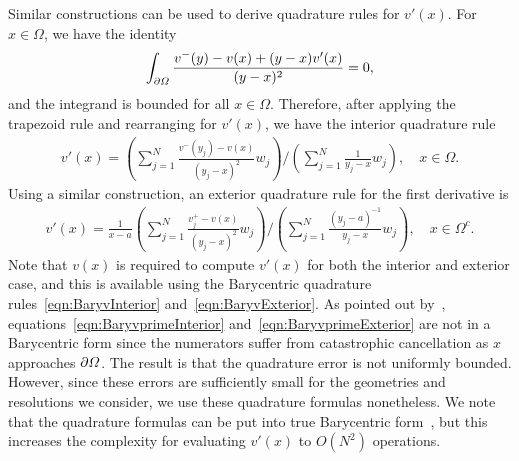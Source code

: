 \documentclass{jfm}
\begin{document}
Similar constructions can be used to derive quadrature rules
for $v'(x)$.  For $x \in \Omega$, we have the identity
\begin{align}
  \int_{{\partial}\varOmega} \frac{v^-(y) - v(x) + (y-x)v'(x)}{(y - x)^2} = 0,
\end{align}
and the integrand is bounded for all $x \in \Omega$.  Therefore, after
applying the trapezoid rule and rearranging for $v'(x)$, we have the
interior quadrature rule
\begin{align}
  v'(x) = \left(\sum_{j=1}^{N}
    \frac{v^{-}(y_j) - v(x)}{(y_j-x)^2} w_j \right)
  \Bigg/
  \left(\sum_{j=1}^{N} \frac{1}{y_j-x} w_j\right), 
  \quad x \in \Omega.
  \label{eqn:BaryvprimeInterior}
\end{align}
Using a similar construction, an exterior quadrature rule for the first
derivative is
\begin{align}
  v'(x) = \frac{1}{x-a} \left(\sum_{j=1}^N
    \frac{v^+_j - v(x)}{(y_j - x)^2} w_j \right)
    \Bigg/
    \left(\sum_{j=1}^N \frac{(y_j-a)^{-1}}{y_j - x} w_j\right),
    \quad x \in \Omega^c.
  \label{eqn:BaryvprimeExterior}
\end{align}
Note that $v(x)$ is required to compute $v'(x)$ for both the interior
and exterior case, and this is available using the Barycentric
quadrature rules~\eqref{eqn:BaryvInterior}
and~\eqref{eqn:BaryvExterior}. As pointed out by~\citet{bar-wu-vee2015},
equations~\eqref{eqn:BaryvprimeInterior}
and~\eqref{eqn:BaryvprimeExterior} are not in a Barycentric form since
the numerators suffer from catastrophic cancellation as $x$ approaches
${\partial}\varOmega$. The result is that the quadrature error is not uniformly
bounded. However, since these errors are sufficiently small for the
geometries and resolutions we consider, we use these quadrature formulas
nonetheless. We note that the quadrature formulas can be put into true
Barycentric form~\citep[see equations (3.11) and
(3.13)]{bar-wu-vee2015}, but this increases the complexity for
evaluating $v'(x)$ to $O(N^2)$ operations.
\end{document}
